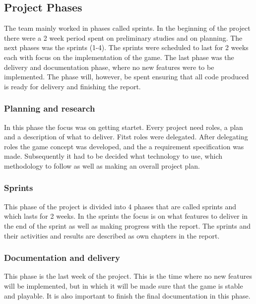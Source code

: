\clearpage
\subsection{Project Phases}

The team mainly worked in phases called sprints. In the beginning of the project there were a 2 week period spent on preliminary studies and on planning. The next phases was the sprints (1-4). The sprints were scheduled to last for 2 weeks each with focus on the implementation of the game. The last phase was the delivery and documentation phase, where no new features were to be implemented. The phase will, however, be spent ensuring that all code produced is ready for delivery and finishing the report.

\subsubsection{Planning and research}
In this phase the focus was on getting startet. Every project need roles, a plan and a description of what to deliver. Fitst roles were delegated. After delegating roles the game concept was developed, and the a requirement specification was made. Subsequently it had to be decided what technology to use, which methodology to follow as well as making an overall project plan. 

\subsubsection{Sprints}
This phase of the project is divided into 4 phases that are called sprints and which lasts for 2 weeks. In the sprints the focus is on what features to deliver in the end of the sprint as well as making progress with the report. The sprints and their activities and results are described as own chapters in the report.

\subsubsection{Documentation and delivery}
This phase is the last week of the project. This is the time where no new features will be implemented, but in which it will be made sure that the game is stable and playable. It is also important to finish the final documentation in this phase.
